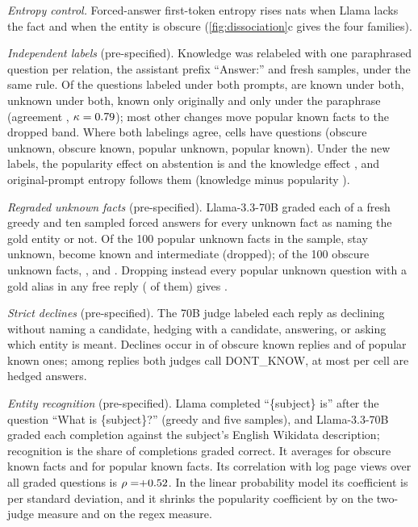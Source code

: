 \documentclass{article}
\begin{document}
\emph{Entropy control.} Forced-answer first-token entropy rises \entLlamaKnow{} nats when Llama lacks the fact and \entLlamaPop{} when the entity is obscure (\cref{fig:dissociation}c gives the four families).

\emph{Independent labels} (pre-specified). Knowledge was relabeled with one paraphrased question per relation, the assistant prefix ``Answer:'' and fresh samples, under the same rule. Of the \lcBothN{} questions labeled under both prompts, \lcKK{} are known under both, \lcUU{} unknown under both, \lcKU{} known only originally and \lcUK{} only under the paraphrase (agreement \lcAgree, $\kappa=0.79$); most other changes move popular known facts to the dropped band. Where both labelings agree, cells have \lcConsN{} questions (obscure unknown, obscure known, popular unknown, popular known). Under the new labels, the popularity effect on abstention is \eoPop{} \eoPopCI{} and the knowledge effect \eoKnow{} \eoKnowCI, and original-prompt entropy follows them (knowledge minus popularity \eoEntKmP{} \eoEntKmPCI).

\emph{Regraded unknown facts} (pre-specified). Llama-3.3-70B graded each of a fresh greedy and ten sampled forced answers for every unknown fact as naming the gold entity or not. Of the 100 popular unknown facts in the sample, \sePUStay{} stay unknown, \sePUKnown{} become known and \sePUInter{} intermediate (dropped); of the 100 obscure unknown facts, \seOUStay{}, \seOUKnown{} and \seOUInter. Dropping instead every popular unknown question with a gold alias in any free reply (\lcPUAlias{} of them) gives \lcAliasDrop{} \lcAliasDropCI.

\emph{Strict declines} (pre-specified). The 70B judge labeled each reply as declining without naming a candidate, hedging with a candidate, answering, or asking which entity is meant. Declines occur in \sdObsKnown{} of obscure known replies and \sdPopKnown{} of popular known ones; among replies both judges call DONT\_KNOW, at most \sdHedgedMax{} per cell are hedged answers.

\emph{Entity recognition} (pre-specified). Llama completed ``\{subject\} is'' after the question ``What is \{subject\}?'' (greedy and five samples), and Llama-3.3-70B graded each completion against the subject's English Wikidata description; recognition is the share of completions graded correct. It averages \ekObsKnown{} for obscure known facts and \ekPopKnown{} for popular known facts. Its correlation with log page views over all graded questions is $\rho=\ekRho$. In the linear probability model its coefficient is \ekCoef{} \ekCoefCI{} per standard deviation, and it shrinks the popularity coefficient by \ekShrink{} on the two-judge measure and \ekShrinkRegex{} on the regex measure.
\end{document}

